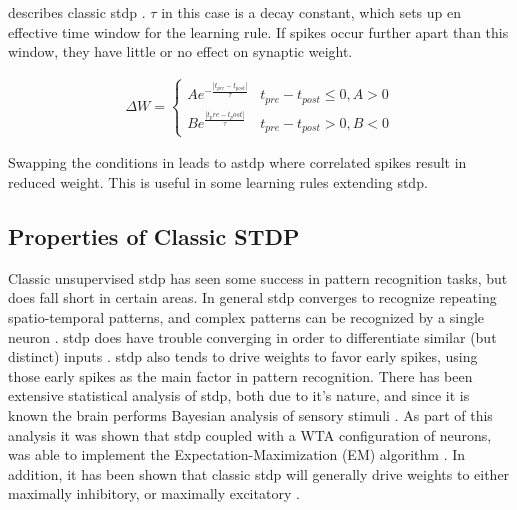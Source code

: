 
     describes classic \gls{stdp}
    \parencite{tavanaei_2019}. $\tau$ in this case is a decay constant, which
    sets up en effective time window for the learning rule. If spikes occur
    further apart than this window, they have little or no effect on synaptic
    weight.

    \begin{align}
        \Delta W =
        \begin{cases}
          Ae^{-\frac{|t_{pre}-t_{post}|}{\tau}} & t_{pre} - t_{post} \leq 0, A > 0
          \\ Be^{\frac{|t_pre-t_post|}{\tau}} & t_{pre} - t_{post} > 0, B < 0
       \end{cases} \label{eq:classic_stdp}
    \end{align}

    Swapping the conditions in  leads to
    \gls{astdp} where correlated spikes result in reduced weight. This
    is useful in some learning rules extending \gls{stdp}.

    \subsection{Properties of Classic STDP}
    Classic unsupervised \gls{stdp} has seen some success in pattern recognition
    tasks, but does fall short in certain areas. In general \gls{stdp} converges
    to recognize repeating spatio-temporal patterns, and complex patterns can be
    recognized by a single neuron \parencite{tavanaei_2019}. \Gls{stdp} does
    have trouble converging in order to differentiate similar (but distinct)
    inputs \parencite{vigneron_2020}. \Gls{stdp} also tends to drive weights to
    favor early spikes, using those early spikes as the main factor in pattern
    recognition. There has been extensive statistical analysis of \gls{stdp},
    both due to it's nature, and since it is known the brain performs Bayesian
    analysis of sensory stimuli \parencite{tavanaei_2019}. As part of this
    analysis it was shown that \gls{stdp} coupled with a WTA configuration of
    neurons, was able to implement the Expectation-Maximization (EM) algorithm
    \parencite{nessler_2009}. In addition, it has been shown that classic
    \gls{stdp} will generally drive weights to either maximally inhibitory, or
    maximally excitatory \parencite{legenstein_2005}.

